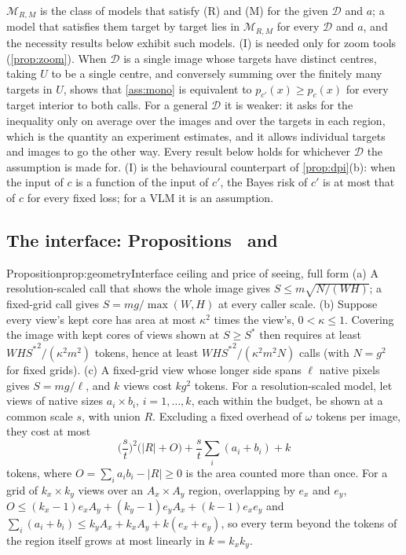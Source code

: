 $\mathcal{M}_{R,M}$ is the class of models that satisfy (R) and (M) for the given $\mathcal{D}$ and $a$; a model that satisfies them target by target lies in $\mathcal{M}_{R,M}$ for every $\mathcal{D}$ and $a$, and the necessity results below exhibit such models. (I) is needed only for zoom tools (\cref{prop:zoom}). When $\mathcal{D}$ is a single image whose targets have distinct centres, taking $U$ to be a single centre, and conversely summing over the finitely many targets in $U$, shows that \cref{ass:mono} is equivalent to $p_{c'}(x) \ge p_c(x)$ for every target interior to both calls. For a general $\mathcal{D}$ it is weaker: it asks for the inequality only on average over the images and over the targets in each region, which is the quantity an experiment estimates, and it allows individual targets and images to go the other way. Every result below holds for whichever $\mathcal{D}$ the assumption is made for. (I) is the behavioural counterpart of \cref{prop:dpi}(b): when the input of $c$ is a function of the input of $c'$, the Bayes risk of $c'$ is at most that of $c$ for every fixed loss; for a VLM it is an assumption.

\subsection{The interface: Propositions~ and~}
\label{sec:proofs-interface}

\begin{restate}{Proposition}{prop:geometry}{Interface ceiling and price of seeing, full form}
(a) A resolution-scaled call that shows the whole image gives $S \le m\sqrt{N/(WH)}$; a fixed-grid call gives $S = mg/\max(W,H)$ at every caller scale.
(b) Suppose every view's kept core has area at most $\kappa^2$ times the view's, $0 < \kappa \le 1$. Covering the image with kept cores of views shown at $S \ge S^\ast$ then requires at least $WH{S^\ast}^2/(\kappa^2 m^2)$ tokens, hence at least $WH{S^\ast}^2/(\kappa^2 m^2 N)$ calls (with $N = g^2$ for fixed grids).
(c) A fixed-grid view whose longer side spans $\ell$ native pixels gives $S = mg/\ell$, and $k$ views cost $kg^2$ tokens. For a resolution-scaled model, let views of native sizes $a_i \times b_i$, $i = 1, \dots, k$, each within the budget, be shown at a common scale $s$, with union $R$. Excluding a fixed overhead of $\omega$ tokens per image, they cost at most
\[
\Big(\frac{s}{t}\Big)^2\big(|R| + O\big) + \frac{s}{t}\sum_i (a_i + b_i) + k
\]
tokens, where $O = \sum_i a_ib_i - |R| \ge 0$ is the area counted more than once. For a grid of $k_x \times k_y$ views over an $A_x \times A_y$ region, overlapping by $e_x$ and $e_y$, $O \le (k_x - 1)e_xA_y + (k_y - 1)e_yA_x + (k - 1)e_xe_y$ and $\sum_i (a_i + b_i) \le k_yA_x + k_xA_y + k(e_x + e_y)$, so every term beyond the tokens of the region itself grows at most linearly in $k = k_xk_y$.
\end{restate}

